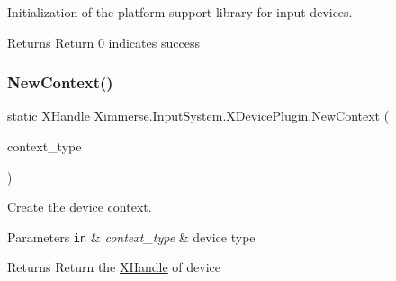 Initialization of the platform support library for input devices. 

\begin{DoxyReturn}{Returns}
Return 0 indicates success 
\end{DoxyReturn}
\mbox{\label{class_ximmerse_1_1_input_system_1_1_x_device_plugin_a8388d5a956a6db84681f404a01e82640}} 
\subsubsection{\texorpdfstring{New\+Context()}{NewContext()}}
{\footnotesize\ttfamily static \mbox{\hyperlink{class_ximmerse_1_1_input_system_1_1_x_device_plugin_1_1_x_handle}{X\+Handle}} Ximmerse.\+Input\+System.\+X\+Device\+Plugin.\+New\+Context (\begin{DoxyParamCaption}\item[{\mbox{\hyperlink{class_ximmerse_1_1_input_system_1_1_x_device_plugin_ab11d2f358709ce84ff419eae941f16d6}{X\+Context\+Types}}}]{context\+\_\+type }\end{DoxyParamCaption})\hspace{0.3cm}{\ttfamily [static]}}



Create the device context. 


\begin{DoxyParams}[1]{Parameters}
\mbox{\tt in}  & {\em context\+\_\+type} & device type \\
\hline
\end{DoxyParams}
\begin{DoxyReturn}{Returns}
Return the \mbox{\hyperlink{class_ximmerse_1_1_input_system_1_1_x_device_plugin_1_1_x_handle}{X\+Handle}} of device 
\end{DoxyReturn}
\mbox{\label{class_ximmerse_1_1_input_system_1_1_x_device_plugin_a2bc3bfc01379e786800b8280ba34765b}} 
